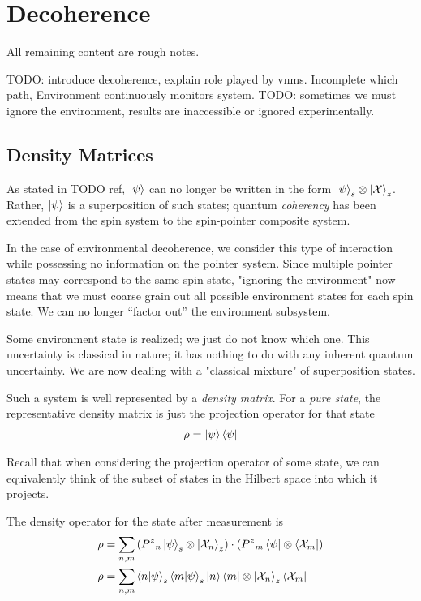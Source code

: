 \chapter{Decoherence}

All remaining content are rough notes.

TODO: introduce decoherence, explain role played by vnms. Incomplete which path, Environment continuously monitors system. TODO: sometimes we must ignore the environment, results are inaccessible or ignored experimentally.

\section{Density Matrices}
As stated in TODO ref, $\ket{\psi}$ can no longer be written in the form $\ket{\psi}_s \otimes \ket{\mathcal{X}}_z$. Rather, $\ket{\psi}$ is a superposition of such states; quantum \textit{coherency} has been extended from the spin system to the spin-pointer composite system.

In the case of environmental decoherence, we consider this type of interaction while possessing no information on the pointer system. Since multiple pointer states may correspond to the same spin state, "ignoring the environment" now means that we must coarse grain out all possible environment states for each spin state. We can no longer ``factor out'' the environment subsystem.

Some environment state is realized; we just do not know which one. This uncertainty is classical in nature; it has nothing to do with any inherent quantum uncertainty. We are now dealing with a "classical mixture" of superposition states.

Such a system is well represented by a \textit{density matrix}. For a \textit{pure state}, the representative density matrix is just the projection operator for that state
\begin{align}
  \rho = \ket{\psi}\bra{\psi}
\end{align}

Recall that when considering the projection operator of some state, we can equivalently think of the subset of states in the Hilbert space into which it projects.

The density operator for the state after measurement is
\begin{align}
\rho &= \sum_{n,m}\left({P^z}_n\ket{\psi}_s \otimes \ket{\mathcal{X}_n}_z \right) \cdot \left({P^z}_m\bra{\psi} \otimes \bra{\mathcal{X}_m} \right) \\
\rho &=  \sum_{n,m}\braket{n|\psi}_s \braket{m|\psi}_s \ket{n}\bra{m} \otimes \ket{\mathcal{X}_n}_z \bra{\mathcal{X}_m}
\end{align}


